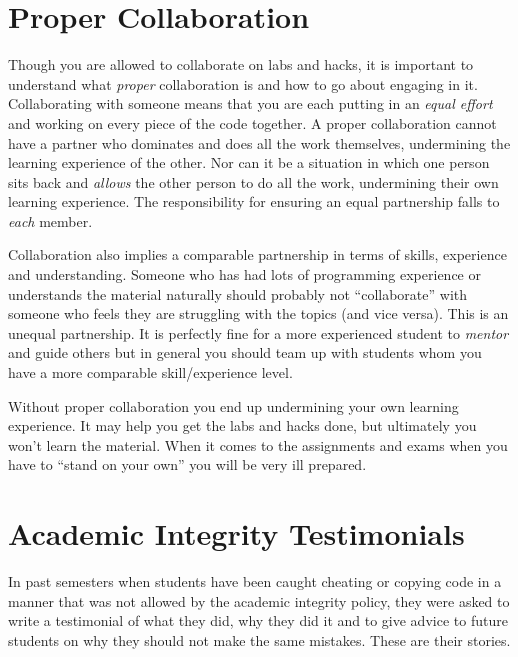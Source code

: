 \documentclass[12pt]{scrartcl}
\begin{document}
\section*{Proper Collaboration}

Though you are allowed to collaborate on labs and hacks, it is important to 
understand what \emph{proper} collaboration is and how to go about engaging
in it.  Collaborating with someone means that you are each putting in an 
\emph{equal effort} and working on every piece of the code together.  
A proper collaboration cannot have a partner who dominates and does all 
the work themselves, undermining the learning experience of the other.
Nor can it be a situation in which one person sits back and \emph{allows}
the other person to do all the work, undermining their own learning 
experience.  The responsibility for ensuring an equal partnership falls
to \emph{each} member.

Collaboration also implies a comparable partnership in terms of skills, 
experience and understanding.  Someone who has had lots of programming 
experience or understands the material naturally should probably not 
``collaborate'' with someone who feels they are struggling with the
topics (and vice versa).  This is an unequal partnership.  It is 
perfectly fine for a more experienced student to \emph{mentor} and 
guide others but in general you should team up with students whom 
you have a more comparable skill/experience level.

Without proper collaboration you end up undermining your own 
learning experience.  It may help you get the labs and hacks done, 
but ultimately you won't learn the material.  When it comes to
the assignments and exams when you have to ``stand on your own''
you will be very ill prepared.  

\newpage
\section*{Academic Integrity Testimonials}

In past semesters when students have been caught cheating or copying code in
a manner that was not allowed by the academic integrity policy, they were asked
to write a testimonial of what they did, why they did it and to give advice
to future students on why they should not make the same mistakes.  These
are their stories.
\end{document}
